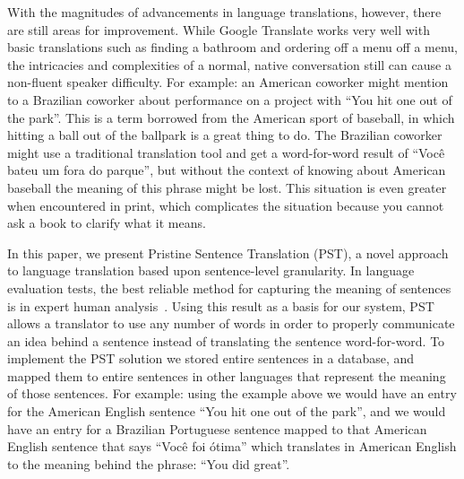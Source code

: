\documentclass[runningheads]{llncs}
\begin{document}
	With the magnitudes of advancements in language translations, however, there are still areas for improvement. While Google Translate works very well with basic translations such as finding a bathroom and ordering off a menu off a menu, the intricacies and complexities of a normal, native conversation still can cause a non-fluent speaker difficulty. For example: an American coworker might mention to a Brazilian coworker about performance on a project with ``You hit one out of the park''. This is a term borrowed from the American sport of baseball, in which hitting a ball out of the ballpark is a great thing to do. The Brazilian coworker might use a traditional translation tool and get a word-for-word result of ``Você bateu um fora do parque'', but without the context of knowing about American baseball the meaning of this phrase might be lost. This situation is even greater when encountered in print, which complicates the situation because you cannot ask a book to clarify what it means.
	

	In this paper, we present Pristine Sentence Translation (PST), a novel approach to language translation based upon sentence-level granularity.  In language evaluation tests, the best reliable method for capturing the meaning of sentences is in expert human analysis~\cite{ref_url18}. Using this result as a basis for our system, PST allows a translator to use any number of words in order to properly communicate an idea behind a sentence instead of translating the sentence word-for-word. To implement the PST solution we stored entire sentences in a database, and mapped them to entire sentences in other languages that represent the meaning of those sentences. For example: using the example above we would have an entry for the American English sentence ``You hit one out of the park'', and we would have an entry for a Brazilian Portuguese sentence mapped to that American English sentence that says ``Você foi ótima'' which translates in American English to the meaning behind the phrase: ``You did great''. 
\end{document}

